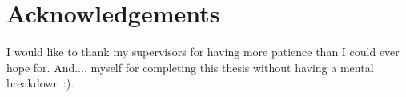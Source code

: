 \thispagestyle{empty}

\chapter*{Acknowledgements}

I would like to thank my supervisors for having more patience than I could
ever hope for. And.... myself for completing this thesis without having
a mental breakdown :).


